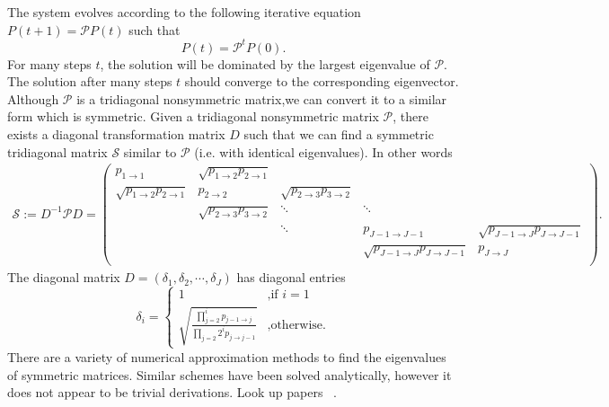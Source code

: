 \documentclass[11pt,a4paper,final]{iopart}
\begin{document}
The system evolves according to the following iterative equation $P(t+1)=\mathcal{P}P(t)$ such that
\begin{equation*}
P(t)=\mathcal{P}^t P(0).
\end{equation*} 
For many steps $t$, the solution will be dominated by the largest eigenvalue of $\mathcal{P}$. 
The solution after many steps $t$ should converge to the corresponding eigenvector. 
Although $\mathcal{P}$ is a tridiagonal nonsymmetric matrix,we can convert it to a similar form which is symmetric. 
Given a tridiagonal nonsymmetric matrix $\mathcal{P}$, there exists a diagonal transformation matrix $D$ such that we can find a symmetric tridiagonal matrix $\mathcal{S}$ similar to  $\mathcal{P}$ (i.e. with identical eigenvalues).
In other words
\begin{align*}
\mathcal{S} := D^{-1} \mathcal{P} D =
\begin{pmatrix}
p_{1 \rightarrow 1} &\sqrt{p_{1 \rightarrow 2}p_{2 \rightarrow 1}} &        &         &         \\
\sqrt{p_{1 \rightarrow 2}p_{2 \rightarrow 1}} & p_{2 \rightarrow 2} & \sqrt{p_{2 \rightarrow 3}p_{3 \rightarrow 2}}    &         &         \\
    & \sqrt{p_{2 \rightarrow 3}p_{3 \rightarrow 2}} & \ddots & \ddots   &         \\
    &     & \ddots & p_{J-1 \rightarrow J-1} & \sqrt{p_{J-1 \rightarrow J}p_{J \rightarrow J-1}} \\
    &     &        & \sqrt{p_{J-1 \rightarrow J}p_{J \rightarrow J-1}} & p_{J \rightarrow J}     \\
\end{pmatrix}.
\end{align*}
The diagonal matrix $D=(\delta_1,\delta_2,\cdots ,\delta_J)$ has diagonal entries
\begin{equation*}
\delta_i =
\begin{cases}
1 & \text{,if } i=1 \\
\sqrt{ \frac{\prod_{j=2}^i{p_{j-1 \rightarrow j}}}{\prod_{j=2}2^i{p_{j \rightarrow j-1}} } } & \text{,otherwise}.
\end{cases}
\end{equation*}
There are a variety of numerical approximation methods to find the eigenvalues of symmetric matrices.
Similar schemes have been solved analytically, however it does not appear to be trivial derivations. Look up papers ~\cite{Moran Random Processes in genetic,Moran Statistical Processes of Evolutionary Theory}.
\end{document}
